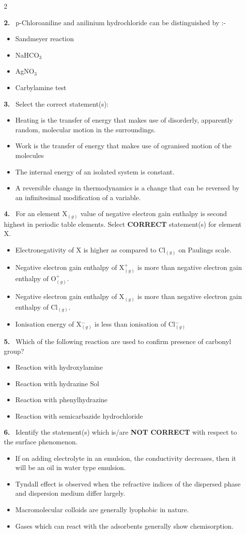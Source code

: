 \documentclass[10pt]{extarticle}
\newcommand{\qn}[1]{\par\smallskip\noindent\textbf{#1.}~}
\newenvironment{qoptions}{\begin{itemize}[leftmargin=1.8em,itemsep=1pt,topsep=2pt,label={}]}{\end{itemize}}
\newcommand{\opt}[2]{\item[(#1)] #2}
\begin{document}
\begin{multicols}{2}
\qn{2} p-Chloroaniline and anilinium hydrochloride can be distinguished by :-
\begin{qoptions}
\opt{A}{Sandmeyer reaction}
\opt{B}{NaHCO$_3$}
\opt{C}{AgNO$_3$}
\opt{D}{Carbylamine test}
\end{qoptions}

\qn{3} Select the correct statement(s):
\begin{qoptions}
\opt{A}{Heating is the transfer of energy that makes use of disorderly, apparently random, molecular motion in the surroundings.}
\opt{B}{Work is the transfer of energy that makes use of ogranised motion of the molecules}
\opt{C}{The internal energy of an isolated system is constant.}
\opt{D}{A reversible change in thermodynamics is a change that can be reversed by an infinitesimal modification of a variable.}
\end{qoptions}

\qn{4} For an element X$_{(g)}$ value of negative electron gain enthalpy is second highest in periodic table elements. Select \textbf{CORRECT} statement(s) for element X.
\begin{qoptions}
\opt{A}{Electronegativity of X is higher as compared to Cl$_{(g)}$ on Paulings scale.}
\opt{B}{Negative electron gain enthalpy of X$^+_{(g)}$ is more than negative electron gain enthalpy of O$^+_{(g)}$.}
\opt{C}{Negative electron gain enthalpy of X$_{(g)}$ is more than negative electron gain enthalpy of Cl$_{(g)}$.}
\opt{D}{Ionisation energy of X$^-_{(g)}$ is less than ionisation of Cl$^-_{(g)}$}
\end{qoptions}

\qn{5} Which of the following reaction are used to confirm presence of carbonyl group?
\begin{qoptions}
\opt{A}{Reaction with hydroxylamine}
\opt{B}{Reaction with hydrazine Sol}
\opt{C}{Reaction with phenylhydrazine}
\opt{D}{Reaction with semicarbazide hydrochloride}
\end{qoptions}

\qn{6} Identify the statement(s) which is/are \textbf{NOT CORRECT} with respect to the surface phenomenon.
\begin{qoptions}
\opt{A}{If on adding electrolyte in an emulsion, the conductivity decreases, then it will be an oil in water type emulsion.}
\opt{B}{Tyndall effect is observed when the refractive indices of the dispersed phase and dispersion medium differ largely.}
\opt{C}{Macromolecular colloids are generally lyophobic in nature.}
\opt{D}{Gases which can react with the adsorbents generally show chemisorption.}
\end{qoptions}


\end{multicols}
\end{document}
